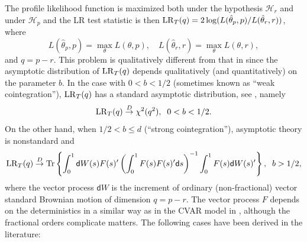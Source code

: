 \documentclass[article]{jss}
\def\lrt{{\rm LR}_T}
\begin{document}
The profile likelihood function is maximized both under the hypothesis $\mathcal{H}_{r}$ and under $\mathcal{H}_{p}$ and the LR test statistic is then $\lrt(q)=2\log(L(\hat{\theta}_{p},p)/L(\hat{\theta}_{r},r))$, where 
\begin{equation*}
L(\hat{\theta}_{p},p)=\max_{\theta}L(\theta,p), \quad L(\hat{\theta}_{r},r)=\max_{\theta}L(\theta,r),
\end{equation*}
and $q=p-r$. This problem is qualitatively different from that in \cite{Johansen1995} since the asymptotic distribution of $\lrt(q)$ depends qualitatively (and quantitatively) on the parameter $b$. In the case with $0<b<1/2$ (sometimes known as \textquotedblleft weak cointegration\textquotedblright ), $\lrt(q)$ has a standard asymptotic distribution, see \citet[Theorem 11(ii)]{johansen2012likelihood}, namely 
\begin{equation}
\lrt(q)\overset{D}{\rightarrow }\chi ^{2}(q^{2}), \; \; 0<b<1/2.
\end{equation}
On the other hand, when $1/2<b\leq d$ (\textquotedblleft strong cointegration\textquotedblright ), asymptotic theory is nonstandard and 
\begin{equation}
\lrt(q)\overset{D}{\rightarrow }\mathrm{Tr}\left\{
\int_{0}^{1}\mathsf{d}W(s)F(s)^{\prime }\left( \int_{0}^{1}F(s)F(s)^{\prime}\mathsf{d}s\right) ^{-1}
\int_{0}^{1}F(s)\mathsf{d}W(s)^{\prime }\right\}, \; \; b>1/2,
\label{LR asy distr}
\end{equation}
where the vector process $\mathsf{d}W$ is the increment of ordinary (non-fractional) vector standard Brownian motion of dimension $q=p-r$. The vector process $F$ depends on the deterministics in a similar way as in the CVAR model in \cite{Johansen1995}, although the fractional orders complicate matters. The following cases have been derived in the literature:
\end{document}
